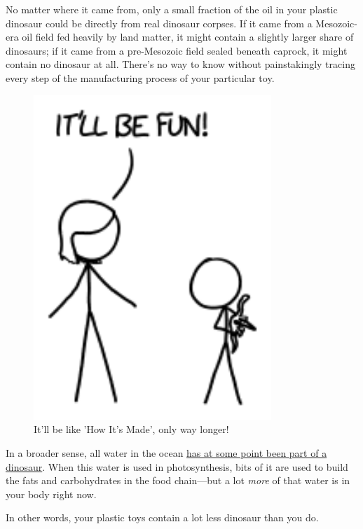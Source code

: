 {{No matter where it came from, only a small fraction of the oil in your plastic dinosaur could be directly from real dinosaur corpses. If it came from a Mesozoic-era oil field fed heavily by land matter, it might contain a slightly larger share of dinosaurs; if it came from a pre-Mesozoic field sealed beneath caprock, it might contain no dinosaur at all. There's no way to know without painstakingly tracing every step of the manufacturing process of your particular toy.}

\begin{figure}[!htbp]
\centering
\includegraphics[scale=0.5, max width=0.8\textwidth]{imgs/a/101/fun.png}
\caption{It'll be like 'How It's Made', only way longer!}
\end{figure}

{In a broader sense, all water in the ocean \href{http://what-if.xkcd.com/74/}{has at some point been part of a dinosaur}. When this water is used in photosynthesis, bits of it are used to build the fats and carbohydrates in the food chain—but a lot \emph{more} of that water is in your body right now.}

{In other words, your plastic toys contain a lot less dinosaur than you do.}

}
